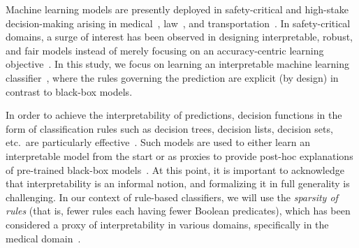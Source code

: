 
Machine learning models are presently deployed in safety-critical and high-stake decision-making arising in medical~\cite{erickson2017machine,kaissis2020secure,kononenko2001machine}, law~\cite{kumar2018law,surden2014machine}, and transportation~\cite{peled2019model,zantalis2019review}. In safety-critical domains, a surge of interest has been observed in designing interpretable, robust, and fair models instead of merely focusing on an accuracy-centric learning objective~\cite{bhagoji2018enhancing,doshi2017towards,du2019techniques,hancox2020robustness,holstein2019improving,mehrabi2021survey,molnar2020interpretable,murdoch2019interpretable}. In this study, we focus on learning an interpretable machine learning classifier~\cite{rudin2019stop}, where the rules governing the prediction are explicit (by design) in contrast to black-box models. 






In order to achieve the interpretability of predictions, decision functions in the form of classification rules such as decision trees,  decision lists, decision sets, etc.\ are particularly effective~\cite{bessiere2009minimising,dash2021lprules,ignatiev2021reasoning,izza2020explaining,lakkaraju2017interpretable,lakkaraju2016interpretable,letham2015interpretable,narodytska2018learning,rivest1987learning,wang2015falling,yu2020optimal}. Such models are used to either learn an interpretable model from the start or as proxies to provide post-hoc explanations of pre-trained black-box models~\cite{gill2020responsible,lundberg2017unified,moradi2021post,ribeiro2016should,slack2020fooling}.  At this point, it is important to acknowledge that interpretability is an informal notion, and formalizing it in full generality is challenging. In our context of rule-based classifiers, we will use the \emph{sparsity of rules} (that is, fewer rules each having fewer Boolean predicates), which has been considered a proxy of interpretability in various domains, specifically in the medical domain~\cite{gage2001validation,lakkaraju2019faithful,letham2015interpretable,malioutov2013exact,myers1962myers}.  

